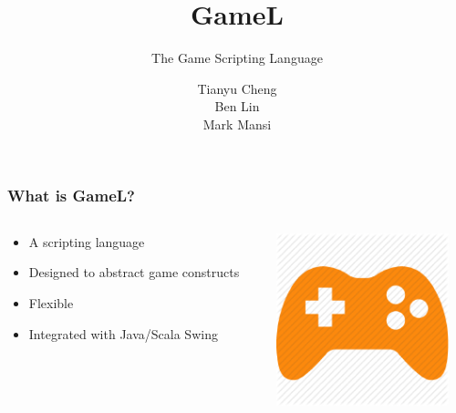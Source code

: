\documentclass{beamer}
\title{GameL}
\subtitle{The Game Scripting Language}
\author{Tianyu Cheng\\ Ben Lin\\ Mark Mansi}
\begin{document}
\begin{frame}
    \maketitle
\end{frame}

\begin{frame}
    \frametitle{What is GameL?}
    \begin{columns}[T]
    \begin{column}[T]{5cm}
    \begin{itemize}[<+->]
        \item{A scripting language}
        \item{Designed to abstract game constructs}
        \item{Flexible}
        \item{Integrated with Java/Scala Swing}
    \end{itemize}
    \end{column}
    \begin{column}[T]{5cm}
        \includegraphics[width=5cm]{../res/icon}
    \end{column}
    \end{columns}
\end{frame}
\end{document}

